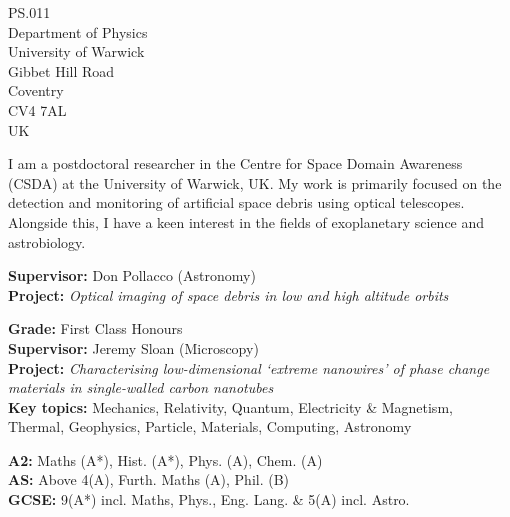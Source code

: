 
\begin{flushright}
\vspace{-1em}
\small PS.011 \\
Department of Physics \\
University of Warwick \\
Gibbet Hill Road \\
Coventry \\
CV4 7AL \\
UK
\end{flushright}

\medskip


\small I am a postdoctoral researcher in the Centre for Space Domain Awareness (CSDA) at the University of Warwick, UK.
My work is primarily focused on the detection and monitoring of artificial space debris using optical telescopes. \\
Alongside this, I have a keen interest in the fields of exoplanetary science and astrobiology.

\medskip


\vspace{-1em}
\small \justify \textbf{Supervisor:} Don Pollacco (Astronomy) \\
\textbf{Project:} \textit{Optical imaging of space debris in low and high altitude orbits}

\divider

\small \textbf{Grade:} First Class Honours \\
\textbf{Supervisor:} Jeremy Sloan (Microscopy) \\
\textbf{Project:} \textit{Characterising low-dimensional `extreme nanowires' of phase change materials in single-walled carbon nanotubes} \\
\textbf{Key topics:} Mechanics, Relativity, Quantum, Electricity \& Magnetism, Thermal, Geophysics, Particle, Materials, Computing, Astronomy 

\divider

\small \textbf{A2:} Maths (A*), Hist. (A*), Phys. (A), Chem. (A) \\
\textbf{AS:} Above 4(A), Furth. Maths (A), Phil. (B) \\
\textbf{GCSE:} 9(A*) incl. Maths, Phys., Eng. Lang. \& 5(A) incl. Astro.
